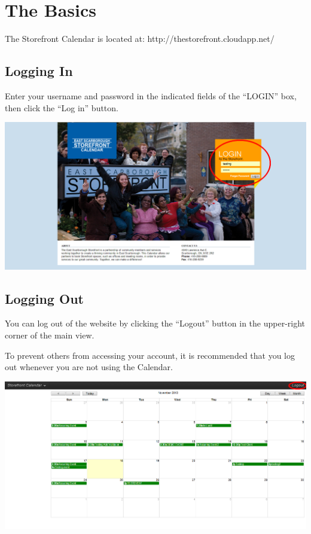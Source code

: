 \section{The Basics}

The Storefront Calendar is located at: http://thestorefront.cloudapp.net/


\subsection{Logging In}

Enter your username and password in the indicated fields of the ``LOGIN'' box, then click the ``Log in'' button.

\includegraphics[width=\linewidth]{screenshots/img_login}


\newpage



\subsection{Logging Out}

You can log out of the website by clicking the ``Logout'' button in the upper-right corner of the main view.

To prevent others from accessing your account, it is recommended that you log out whenever you are not using the Calendar.

\includegraphics[width=\linewidth]{screenshots/img_logout}


